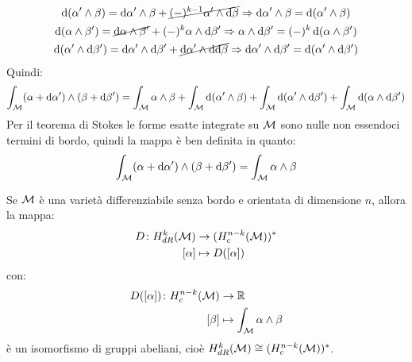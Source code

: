 \begin{gather*}
  \d (\alpha' \wedge \beta) = \d \alpha' \wedge \beta + \cancel{(-)^{k-1} \alpha' \wedge \d \beta} \Rightarrow  \d \alpha' \wedge \beta = \d (\alpha' \wedge \beta) \\
  \d (\alpha \wedge \beta') = \cancel{\d \alpha \wedge \beta'} + (-)^{k} \alpha \wedge \d \beta' \Rightarrow  \alpha \wedge \d \beta' = (-)^k  \d (\alpha \wedge \beta') \\
  \d (\alpha' \wedge \d \beta') = \d \alpha' \wedge \d \beta' + \cancel{\d \alpha' \wedge \d {\d \beta}} \Rightarrow \d \alpha' \wedge \d \beta' =  \d (\alpha' \wedge \d \beta')
\end{gather*}
Quindi:
\[
  \int_{\mathcal{M}} (\alpha + \operatorname{d}\!{\alpha}') \wedge (\beta + \operatorname{d}\!{\beta}') = \int_{\mathcal{M}} \alpha \wedge \beta + \int_{\mathcal{M}} \operatorname{d}\!{(\alpha' \wedge \beta)} + \int_{\mathcal{M}} \operatorname{d}\!{(\alpha' \wedge \operatorname{d}\!{\beta}')} + \int_{\mathcal{M}} \operatorname{d}\!{(\alpha \wedge \operatorname{d}\!{\beta}')}
\]
Per il teorema di Stokes le forme esatte integrate su $ \mathcal{M} $ sono nulle non
essendoci termini di bordo, quindi la mappa è ben definita in quanto:
\[
  \int_{\mathcal{M}} (\alpha + \operatorname{d}\!{\alpha}') \wedge (\beta + \operatorname{d}\!{\beta}') = \int_{\mathcal{M}} \alpha \wedge \beta
\]
\begin{theorem}
  Se $ \mathcal{M} $ è una varietà  differenziabile senza bordo e orientata di dimensione
  $ n $, allora la mappa:
  \begin{align*}
    D \colon H^k_{dR}(\mathcal{M}) & \to (H_c^{n-k}(\mathcal{M}))^* \\
    [\alpha] & \mapsto D([\alpha])
  \end{align*}
  con:
  \begin{align*}
    D([\alpha]) \colon H^{n-k}_c(\mathcal{M}) & \to \mathbb{R}^{} \\
    [\beta] & \mapsto \int_{\mathcal{M}} \alpha \wedge \beta
  \end{align*}
  è un isomorfismo di gruppi abeliani, cioè $ H^k_{dR}(\mathcal{M}) \cong (H^{n-k}_c(\mathcal{M}))^* $.
\end{theorem}
